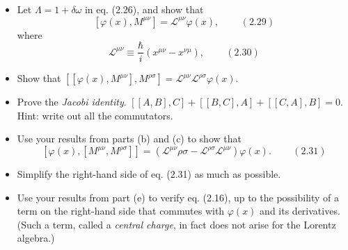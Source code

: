 \documentclass[twoside]{amsart}
\newcommand{\problemhead}[1]
  {\smallskip
   \noindent{\large\bf Problem #1.}
   }
\begin{document}
\problemhead{2.8} \begin{itemize}
\item[(a)] Let $\Lambda = 1 + \delta \omega$ in eq. (2.26), and show that 
\[
\left[ \varphi(x), M^{\mu \nu} \right] = \mathcal{L}^{\mu \nu} \varphi(x), \quad \quad \, (2.29)
\]
where 
\[
\mathcal{L}^{\mu \nu } \equiv \frac{\hbar }{ i } (x^{\mu \nu} - x^{\nu \mu}), \quad \quad \, (2.30)
\]
\item[(b)] Show that $\left[ \left[ \varphi(x), M^{\mu \nu} \right], M^{\rho \sigma} \right] = \mathcal{L}^{\mu \nu} \mathcal{L}^{\rho \sigma} \varphi(x)$.  
\item[(c)] Prove the \emph{Jacobi identity}.  $\left[ \left[ A, B \right], C \right] + [[B,C],A] + [[C,A],B] =0$.  Hint: write out all the commutators.  
\item[(d)] Use your results from parts (b) and (c) to show that 
\[
\left[ \varphi(x), [ M^{\mu \nu}, M^{\rho \sigma} ] \right] = ( \mathcal{L}^{\mu \nu} \mathcal{\rho \sigma} - \mathcal{L}^{\rho \sigma} \mathcal{L}^{\mu \nu } ) \varphi(x). \quad \quad \, (2.31)
\]
\item[(e)] Simplify the right-hand side of eq. (2.31) as much as possible.  
\item[(f)] Use your results from part (e) to verify eq. (2.16), up to the possibility of a term on the right-hand side that commutes with $\varphi(x)$ and its derivatives.  (Such a term, called a \emph{central charge}, in fact does not arise for the Lorentz algebra.)
\end{itemize}
\end{document}
